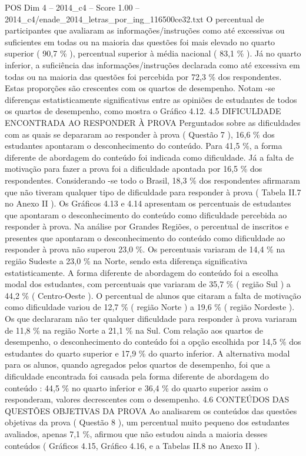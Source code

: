 \begin{textsample}{POS Dim 4 – 2014\_c4 – Score 1.00 – 2014\_c4/enade\_2014\_letras\_por\_ing\_116500ce32.txt}
O percentual de participantes que avaliaram as informações/instruções como até excessivas ou suficientes em todas ou na maioria das questões foi mais elevado no quarto superior ( 90,7 \% ), percentual superior à média nacional ( 83,1 \% ).
Já no quarto inferior, a suficiência das informações/instruções declarada como até excessiva em todas ou na maioria das questões foi percebida por 72,3 \% dos respondentes.
Estas proporções são crescentes com os quartos de desempenho.
Notam -se diferenças estatisticamente significativas entre as opiniões de estudantes de todos os quartos de desempenho, como mostra o Gráfico 4.12. 4.5 DIFICULDADE ENCONTRADA AO RESPONDER À PROVA Perguntados sobre as dificuldades com as quais se depararam ao responder à prova ( Questão 7 ), 16,6 \% dos estudantes apontaram o desconhecimento do conteúdo.
Para 41,5 \%, a forma diferente de abordagem do conteúdo foi indicada como dificuldade.
Já a falta de motivação para fazer a prova foi a dificuldade apontada por 16,5 \% dos respondentes.
Considerando -se todo o Brasil, 18,3 \% dos respondentes afirmaram que não tiveram qualquer tipo de dificuldade para responder à prova ( Tabela II.7 no Anexo II ).
Os Gráficos 4.13 e 4.14 apresentam os percentuais de estudantes que apontaram o desconhecimento do conteúdo como dificuldade percebida ao responder à prova.
Na análise por Grandes Regiões, o percentual de inscritos e presentes que apontaram o desconhecimento do conteúdo como dificuldade ao responder à prova não superou 23,0 \%.
Os percentuais variaram de 14,4 \% na região Sudeste a 23,0 \% na Norte, sendo esta diferença significativa estatisticamente.
A forma diferente de abordagem do conteúdo foi a escolha modal dos estudantes, com percentuais que variaram de 35,7 \% ( região Sul ) a 44,2 \% ( Centro-Oeste ).
O percentual de alunos que citaram a falta de motivação como dificuldade variou de 12,7 \% ( região Norte ) a 19,6 \% ( região Nordeste ).
Os que declararam não ter qualquer dificuldade para responder à prova variaram de 11,8 \% na região Norte a 21,1 \% na Sul.
Com relação aos quartos de desempenho, o desconhecimento do conteúdo foi a opção escolhida por 14,5 \% dos estudantes do quarto superior e 17,9 \% do quarto inferior.
A alternativa modal para os alunos, quando agregados pelos quartos de desempenho, foi que a dificuldade encontrada foi causada pela forma diferente de abordagem do conteúdo : 44,5 \% no quarto inferior e 36,4 \% do quarto superior assim o responderam, valores decrescentes com o desempenho. 4.6 CONTEÚDOS DAS QUESTÕES OBJETIVAS DA PROVA Ao analisarem os conteúdos das questões objetivas da prova ( Questão 8 ), um percentual muito pequeno dos estudantes avaliados, apenas 7,1 \%, afirmou que não estudou ainda a maioria desses conteúdos ( Gráficos 4.15, Gráfico 4.16, e a Tabelas II.8 no Anexo II ).

\end{textsample}
